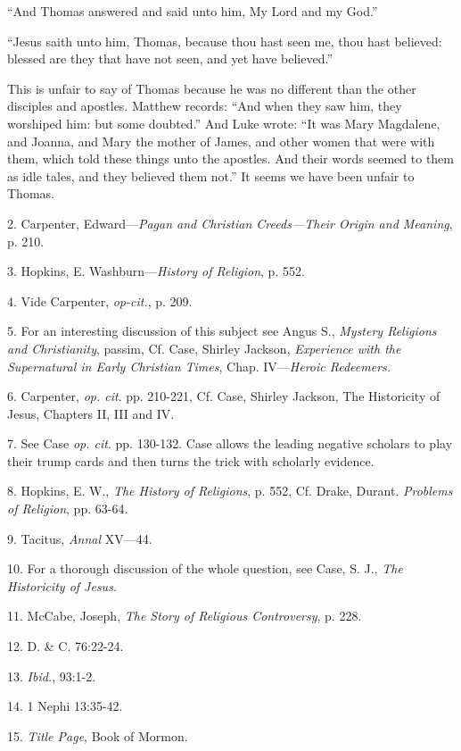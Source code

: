 ``And Thomas answered and said unto him, My Lord and my God.''

``Jesus saith unto him, Thomas, because thou hast seen me, thou hast believed: blessed are
they that have not seen, and yet have believed.''

This is unfair to say of Thomas because he was no different than the other disciples and
apostles. Matthew records: ``And when they saw him, they worshiped him: but some
doubted.'' And Luke wrote: ``It was Mary Magdalene, and Joanna, and Mary the mother of
James, and other women that were with them, which told these things unto the apostles. And
their words seemed to them as idle tales, and they believed them not.'' It seems we have been
unfair to Thomas.

2. Carpenter, Edward—\textit{Pagan and Christian Creeds—Their Origin and Meaning}, p. 210.

3. Hopkins, E. Washburn—\textit{History of Religion}, p. 552.

4. Vide Carpenter, \textit{op-cit.}, p. 209.

5. For an interesting discussion of this subject see Angus S., \textit{Mystery Religions and
Christianity}, passim, Cf. Case, Shirley Jackson, \textit{Experience with the Supernatural in Early
Christian Times}, Chap. IV—\textit{Heroic Redeemers.}

6. Carpenter, \textit{op. cit}. pp. 210-221, Cf. Case, Shirley Jackson, The Historicity of Jesus,
Chapters II, III and IV.

7. See Case \textit{op. cit}. pp. 130-132. Case allows the leading negative scholars to play their
trump cards and then turns the trick with scholarly evidence.

8. Hopkins, E. W., \textit{The History of Religions}, p. 552, Cf. Drake, Durant. \textit{Problems of Religion},
pp. 63-64.

9. Tacitus, \textit{Annal} XV—44.

10. For a thorough discussion of the whole question, see Case, S. J., \textit{The Historicity of Jesus.}

11. McCabe, Joseph, \textit{The Story of Religious Controversy}, p. 228.

12. D. \& C. 76:22-24.

13. \textit{Ibid.}, 93:1-2.

14. 1 Nephi 13:35-42.

15. \textit{Title Page}, Book of Mormon.

